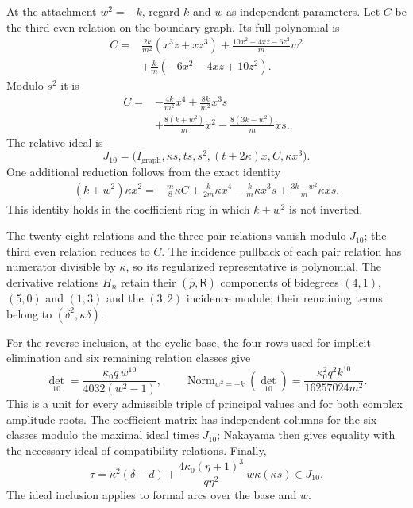 \documentclass[11pt,a4paper]{article}
\numberwithin{equation}{section}
\theoremstyle{plain}
\theoremstyle{definition}
\theoremstyle{remark}
\begin{document}
At the attachment $w^2=-k$, regard $k$ and $w$ as independent parameters. Let $C$ be the third even relation on the boundary graph. Its full
polynomial is
\[
 \begin{aligned}
 C={}&\frac{2k}{m^2}(x^3z+xz^3)
       +\frac{10x^2-4xz-6z^2}{m}w^2\\
     &+\frac{k}{m}(-6x^2-4xz+10z^2).
 \end{aligned}
\]
Modulo $s^2$ it is
\[
\begin{aligned}
 C={}&-\frac{4k}{m^2}x^4+\frac{8k}{m^2}x^3s\\
    &+\frac{8(k+w^2)}m x^2-\frac{8(3k-w^2)}m xs.
\end{aligned}
\]
The relative ideal is
\[
 J_{10}=\bigl(I_{\mathrm{graph}},\kappa s,ts,s^2,(t+2\kappa)x,
                         C,\kappa x^3\bigr).
\]
One additional reduction follows from the exact identity
\[
\begin{aligned}
 (k+w^2)\kappa x^2={}&\frac m8\kappa C
 +\frac{k}{2m}\kappa x^4-\frac km\kappa x^3s
 +\frac{3k-w^2}{m}\kappa xs.
\end{aligned}
\]
This identity holds in the coefficient ring in which $k+w^2$ is not inverted.

The twenty-eight relations and the three pair relations vanish
modulo $J_{10}$; the third even relation reduces to $C$. The incidence pullback of each pair relation has numerator divisible
by $\kappa$, so its regularized representative is polynomial.
The derivative relations $H_n$ retain their $(\widehat p,\mathsf R)$ components of bidegrees
$(4,1)$, $(5,0)$ and $(1,3)$ and the $(3,2)$ incidence module;
their remaining terms belong to $(\delta^2,\kappa\delta)$.

For the reverse inclusion, at the cyclic base, the four rows used for implicit elimination and six remaining relation classes give
\[
 \det_{10}=\frac{\kappa_0 q\,w^{10}}{4032(w^2-1)},\qquad
 \operatorname{Norm}_{w^2=-k}(\det_{10})
 =\frac{\kappa_0 ^2q^2k^{10}}{16257024m^2}.
\]
This is a unit for every admissible triple of principal values and for both complex
amplitude roots. The coefficient matrix has independent columns for
the six classes modulo the maximal ideal times $J_{10}$; Nakayama
then gives equality with the necessary ideal of compatibility relations. Finally,
\[
 \tau=\kappa^2(\delta-d)
       +\frac{4\kappa_0 (\eta +1)^3}{q\eta ^2}\,w\kappa(\kappa s)\in J_{10}.
\]
The ideal inclusion applies to formal arcs over the base and $w$.
\end{document}
